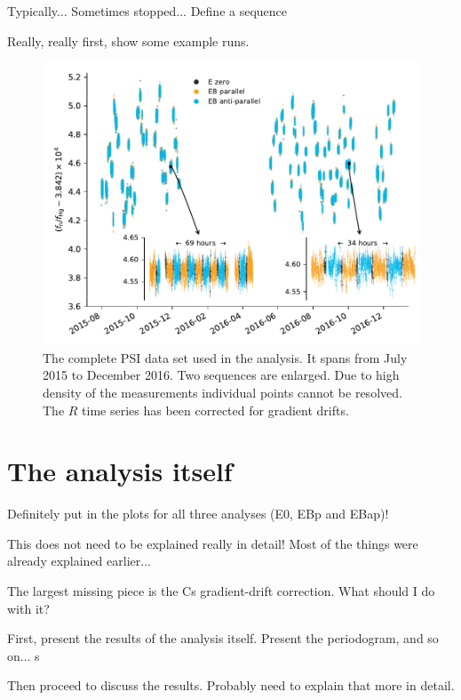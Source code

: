 Typically... Sometimes stopped... Define a sequence



Really, really first, show some example runs. 

\begin{figure}
  \centering
  \includegraphics[width=\linewidth]{gfx/axions/deltah4mm_time_domain_inset_no_yerr.pdf}
  \caption{The complete PSI data set used in the analysis. It spans from July 2015 to December 2016. Two sequences are enlarged. Due to high density of the measurements individual points cannot be resolved. The $R$ time series has been corrected for gradient drifts.}
  \label{fig:PSI_dataset_time_domain}
\end{figure}

\section{The analysis itself}

Definitely put in the plots for all three analyses (E0, EBp and EBap)!

This does not need to be explained really in detail! Most of the things were already explained earlier...

The largest missing piece is the Cs gradient-drift correction. What should I do with it?

First, present the results of the analysis itself. Present the periodogram, and so on...
s



Then proceed to discuss the results. Probably need to explain that more in detail.

